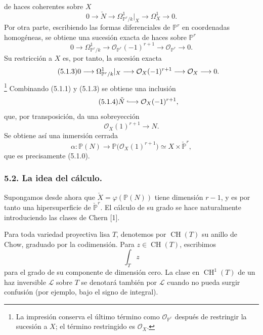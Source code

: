 de haces coherentes sobre $X$
\begin{equation}\tag{5.1.1}
0\longrightarrow\check N
\longrightarrow\Omega^1_{\mathbb P^r/k}|_X
\longrightarrow\Omega^1_X
\longrightarrow0.
\end{equation}
Por otra parte, escribiendo las formas diferenciales de $\mathbb P^r$
en coordenadas homogéneas, se obtiene una sucesión exacta de haces
sobre $\mathbb P^r$
\begin{equation}\tag{5.1.2}
0\longrightarrow\Omega^1_{\mathbb P^r/k}
\longrightarrow\mathcal O_{\mathbb P^r}(-1)^{r+1}
\longrightarrow\mathcal O_{\mathbb P^r}
\longrightarrow0.
\end{equation}
Su restricción a $X$ es, por tanto, la sucesión exacta
\begin{equation}\tag{5.1.3}
0\longrightarrow\Omega^1_{\mathbb P^r/k}|_X
\longrightarrow\mathcal O_X(-1)^{r+1}
\longrightarrow\mathcal O_{\sisi{\mathbb P^r}{X}}
\longrightarrow0.
\end{equation}
\footnote{La impresión conserva el último término como
$\mathcal O_{\mathbb P^r}$ después de restringir la sucesión a $X$;
el término restringido es $\mathcal O_X$.}
Combinando (5.1.1) y (5.1.3) se obtiene una inclusión
\begin{equation}\tag{5.1.4}
\check N\lhook\joinrel\longrightarrow\mathcal O_X(-1)^{r+1},
\end{equation}
que, por transposición, da una sobreyección
\begin{equation}\tag{5.1.5}
\mathcal O_X(1)^{r+1}\longrightarrow N.
\end{equation}
Se obtiene así una inmersión cerrada
\begin{equation}\tag{5.1.6}
\alpha:\mathbb P(N)
\longrightarrow\mathbb P\bigl(\mathcal O_X(1)^{r+1}\bigr)
\simeq X\times\check{\mathbb P}^{r},
\end{equation}
que es precisamente (5.1.0).

\pageoriginale

\subsubsection*{5.2. La idea del cálculo.}

Supongamos desde ahora que
$\check X=\varphi(\mathbb P(N))$ tiene dimensión $r-1$, y es por tanto
una hipersuperficie de $\check{\mathbb P}^{r}$. El cálculo de su grado
se hace naturalmente introduciendo las clases de Chern [1].

Para toda variedad proyectiva lisa $T$, denotemos por
$\operatorname{CH}(T)$ su anillo de Chow, graduado por la codimensión.
Para $z\in\operatorname{CH}(T)$, escribimos
\[
\int_Tz
\]
para el grado de su componente de dimensión cero. La clase en
$\operatorname{CH}^1(T)$ de un haz inversible $\mathcal L$ sobre $T$
se denotará también por $\mathcal L$ cuando no pueda surgir confusión
(por ejemplo, bajo el signo de integral).

